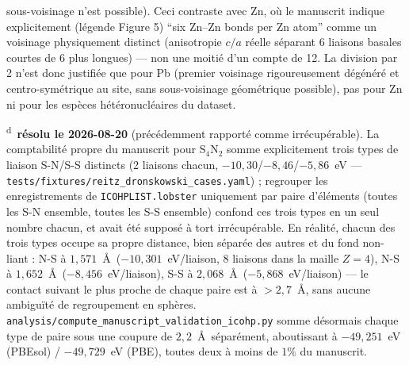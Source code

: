 sous-voisinage n'est possible). Ceci contraste avec Zn, où le manuscrit indique explicitement (légende Figure 5) ``six Zn--Zn bonds per Zn atom'' comme un voisinage physiquement distinct (anisotropie $c/a$ réelle séparant 6 liaisons basales courtes de 6 plus longues) --- non une moitié d'un compte de 12. La division par 2 n'est donc justifiée que pour Pb (premier voisinage rigoureusement dégénéré et centro-symétrique au site, sans sous-voisinage géométrique possible), pas pour Zn ni pour les espèces hétéronucléaires du dataset.

\noindent\textsuperscript{d}~\textbf{résolu le 2026-08-20} (précédemment rapporté comme irrécupérable). La comptabilité propre du manuscrit pour S$_4$N$_2$ somme explicitement trois types de liaison S-N/S-S distincts (2 liaisons chacun, $-10{,}30$/$-8{,}46$/$-5{,}86$~eV --- \texttt{tests/fixtures/reitz\_dronskowski\_cases.yaml}) ; regrouper les enregistrements de \texttt{ICOHPLIST.lobster} uniquement par paire d'éléments (toutes les S-N ensemble, toutes les S-S ensemble) confond ces trois types en un seul nombre chacun, et avait été supposé à tort irrécupérable. En réalité, chacun des trois types occupe sa propre distance, bien séparée des autres et du fond non-liant : N-S à $1{,}571$~\AA\ ($-10{,}301$~eV/liaison, 8 liaisons dans la maille $Z=4$), N-S à $1{,}652$~\AA\ ($-8{,}456$~eV/liaison), S-S à $2{,}068$~\AA\ ($-5{,}868$~eV/liaison) --- le contact suivant le plus proche de chaque paire est à $>2{,}7$~\AA, sans aucune ambiguïté de regroupement en sphères. \texttt{analysis/compute\_manuscript\_validation\_icohp.py} somme désormais chaque type de paire sous une coupure de $2{,}2$~\AA\ séparément, aboutissant à $-49{,}251$~eV (PBEsol) / $-49{,}729$~eV (PBE), toutes deux à moins de $1\%$ du manuscrit.\\
